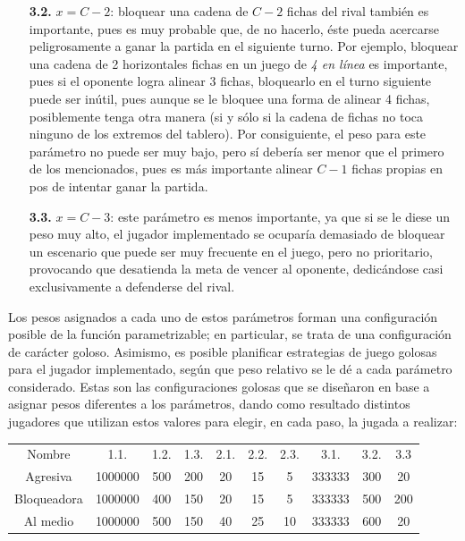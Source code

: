 \documentclass[12pt,a4paper]{article}
\begin{document}
\begin{itemize}
\begin{itemize}
                \item[\textbf{3.2.}] $x = C-2$: bloquear una cadena de $C-2$ fichas del rival también es importante, pues es muy probable que, de no hacerlo, éste pueda acercarse peligrosamente a ganar la partida en el siguiente turno. Por ejemplo, bloquear una cadena de 2 horizontales fichas en un juego de \textit{4 en línea} es importante, pues si el oponente logra alinear 3 fichas, bloquearlo en el turno siguiente puede ser inútil, pues aunque se le bloquee una forma de alinear 4 fichas, posiblemente tenga otra manera (si y sólo si la cadena de fichas no toca ninguno de los extremos del tablero). Por consiguiente, el peso para este parámetro no puede ser muy bajo, pero sí debería ser menor que el primero de los mencionados, pues es más importante alinear $C-1$ fichas propias en pos de intentar ganar la partida.
                \item[\textbf{3.3.}] $x = C-3$: este parámetro es menos importante, ya que si se le diese un peso muy alto, el jugador implementado se ocuparía demasiado de bloquear un escenario que puede ser muy frecuente en el juego, pero no prioritario, provocando que desatienda la meta de vencer al oponente, dedicándose casi exclusivamente a defenderse del rival.
            \end{itemize}
    \end{itemize}
    
    Los pesos asignados a cada uno de estos parámetros forman una configuración posible de la función parametrizable; en particular, se trata de una configuración de carácter goloso. Asimismo, es posible planificar estrategias de juego golosas para el jugador implementado, según que peso relativo se le dé a cada parámetro considerado. Estas son las configuraciones golosas que se diseñaron en base a asignar pesos diferentes a los parámetros, dando como resultado distintos jugadores que utilizan estos valores para elegir, en cada paso, la jugada a realizar:
    
    \begin{center}
		\begin{tabular}{ | c || c | c | c | c | c | c | c | c | c | }
		\hline
		Nombre &  1.1. &  1.2. &  1.3. &  2.1. &  2.2. &  2.3. &  3.1. &  3.2. &  3.3 \\ \hhline{|=#=|=|=|=|=|=|=|=|=|}
		    Agresiva &  1000000 &  500 &  200 &  20 &  15 &  5 &  333333 &  300 &  20 \\ \hline
		    Bloqueadora &  1000000 &  400 &  150 &  20 &  15 &  5 &  333333 &  500 &  200 \\ \hline
		    Al medio &  1000000 &  500 &  150 &  40 &  25 &  10 &  333333 &  600 &  20 \\ \hline
		\end{tabular}
    \end{center}
    
\end{document}
